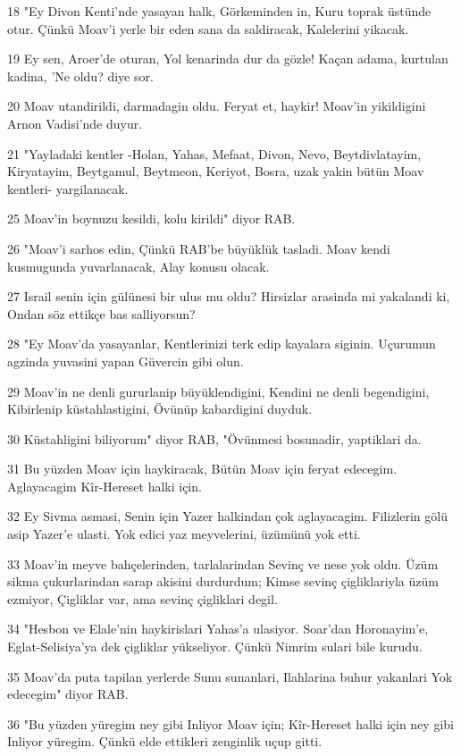 \par 18 "Ey Divon Kenti'nde yasayan halk, Görkeminden in, Kuru toprak üstünde otur. Çünkü Moav'i yerle bir eden sana da saldiracak, Kalelerini yikacak.
\par 19 Ey sen, Aroer'de oturan, Yol kenarinda dur da gözle! Kaçan adama, kurtulan kadina, 'Ne oldu? diye sor.
\par 20 Moav utandirildi, darmadagin oldu. Feryat et, haykir! Moav'in yikildigini Arnon Vadisi'nde duyur.
\par 21 "Yayladaki kentler -Holan, Yahas, Mefaat, Divon, Nevo, Beytdivlatayim, Kiryatayim, Beytgamul, Beytmeon, Keriyot, Bosra, uzak yakin bütün Moav kentleri- yargilanacak.
\par 25 Moav'in boynuzu kesildi, kolu kirildi" diyor RAB.
\par 26 "Moav'i sarhos edin, Çünkü RAB'be büyüklük tasladi. Moav kendi kusmugunda yuvarlanacak, Alay konusu olacak.
\par 27 Israil senin için gülünesi bir ulus mu oldu? Hirsizlar arasinda mi yakalandi ki, Ondan söz ettikçe bas salliyorsun?
\par 28 "Ey Moav'da yasayanlar, Kentlerinizi terk edip kayalara siginin. Uçurumun agzinda yuvasini yapan Güvercin gibi olun.
\par 29 Moav'in ne denli gururlanip büyüklendigini, Kendini ne denli begendigini, Kibirlenip küstahlastigini, Övünüp kabardigini duyduk.
\par 30 Küstahligini biliyorum" diyor RAB, "Övünmesi bosunadir, yaptiklari da.
\par 31 Bu yüzden Moav için haykiracak, Bütün Moav için feryat edecegim. Aglayacagim Kîr-Hereset halki için.
\par 32 Ey Sivma asmasi, Senin için Yazer halkindan çok aglayacagim. Filizlerin gölü asip Yazer'e ulasti. Yok edici yaz meyvelerini, üzümünü yok etti.
\par 33 Moav'in meyve bahçelerinden, tarlalarindan Sevinç ve nese yok oldu. Üzüm sikma çukurlarindan sarap akisini durdurdum; Kimse sevinç çigliklariyla üzüm ezmiyor, Çigliklar var, ama sevinç çigliklari degil.
\par 34 "Hesbon ve Elale'nin haykirislari Yahas'a ulasiyor. Soar'dan Horonayim'e, Eglat-Selisiya'ya dek çigliklar yükseliyor. Çünkü Nimrim sulari bile kurudu.
\par 35 Moav'da puta tapilan yerlerde Sunu sunanlari, Ilahlarina buhur yakanlari Yok edecegim" diyor RAB.
\par 36 "Bu yüzden yüregim ney gibi Inliyor Moav için; Kîr-Hereset halki için ney gibi Inliyor yüregim. Çünkü elde ettikleri zenginlik uçup gitti.
